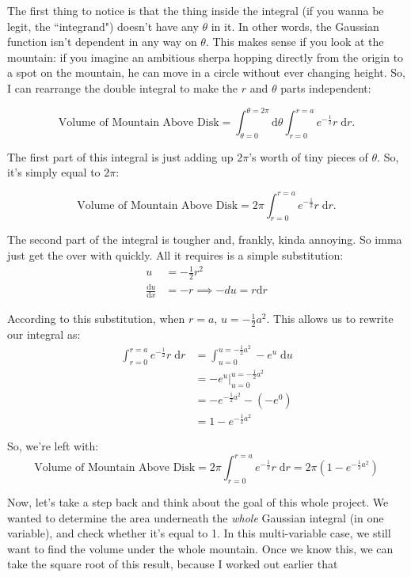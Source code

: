 \documentclass[11pt,titlepage]{article}
\begin{document}
The first thing to notice is that the thing inside the integral (if you wanna be legit, the ``integrand") doesn't have any $\theta$ in it. In other words, the Gaussian function isn't dependent in any way on $\theta$. This makes sense if you look at the mountain: if you imagine an ambitious sherpa hopping directly from the origin to a spot on the mountain, he can move in a circle without ever changing height. So, I can rearrange the double integral to make the $r$ and $\theta$ parts independent:

$$\text{Volume of Mountain Above Disk} = \int_{\theta = 0}^{\theta = 2\pi}\text{d}\theta \int_{r = 0}^{r = a} e^{-\frac{1}{2}}r\;\text{d}r.$$

The first part of this integral is just adding up $2\pi$'s worth of tiny pieces of $\theta$. So, it's simply equal to $2\pi$: 

$$\text{Volume of Mountain Above Disk} = 2\pi \int_{r = 0}^{r = a} e^{-\frac{1}{2}}r\;\text{d}r.$$

The second part of the integral is tougher and, frankly, kinda annoying. So imma just get the over with quickly. All it requires is a simple substitution:
\begin{align*}
u &= -\frac{1}{2}r^2\\
\frac{\text{d}u}{\text{d}x} &= -r \implies -du = r\text{d}r
\end{align*}

According to this substitution, when $r = a$, $u = -\frac{1}{2}a^2$. This allows us to rewrite our integral as:
\begin{align*}
\int_{r = 0}^{r = a} e^{-\frac{1}{2}}r\;\text{d}r &= \int_{u=0}^{u = -\frac{1}{2}a^2} -e^u\;\text{d}u \\
&= -e^u \Bigr\rvert_{u = 0}^{u = -\frac{1}{2}a^2}\\
&= -e^{-\frac{1}{2}a^2}-(-e^0)\\
&= 1-e^{-\frac{1}{2}a^2}
\end{align*}

So, we're left with:
$$\text{Volume of Mountain Above Disk} = 2\pi \int_{r = 0}^{r = a} e^{-\frac{1}{2}}r\;\text{d}r = 2\pi(1-e^{-\frac{1}{2}a^2})$$

Now, let's take a step back and think about the goal of this whole project. We wanted to determine the area underneath the \textit{whole} Gaussian integral (in one variable), and check whether it's equal to 1. In this multi-variable case, we still want to find the volume under the whole mountain. Once we know this, we can take the square root of this result, because I worked out earlier that
\end{document}
